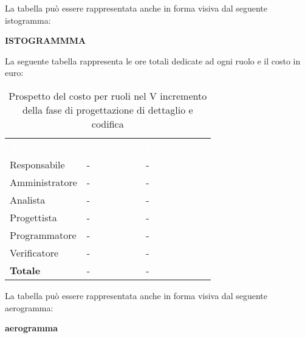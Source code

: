 La tabella può essere rappresentata anche in forma visiva dal seguente istogramma:

\textbf{ISTOGRAMMMA}


La seguente tabella rappresenta le ore totali dedicate ad ogni ruolo e il costo in euro:

\begin{table}[!htbp]
\begin{center}
\renewcommand{\arraystretch}{1.5}
\begin{tabular}{ m{}<{\centering}  m{}<{\centering} m{}<{\centering}}
	\rowcolor{darkblue}
	\textcolor{white}{\textbf{Ruolo}}&\textcolor{white}{\textbf{Totale ore}}&\textcolor{white}{\textbf{Costo totale}}\\ 

	Responsabile  & - & - \\	

	Amministratore & - & - \\
	
	Analista & - & - \\
	
	Progettista & - & - \\
	
	Programmatore & - & - \\
	
	Verificatore & - & - \\
	
	\textbf{Totale} & - & - \\
	
\end{tabular}
\caption{Prospetto del costo per ruoli nel V incremento della fase di progettazione di dettaglio e codifica}
\end{center}
\end{table}

La tabella può essere rappresentata anche in forma visiva dal seguente aerogramma:

\textbf{aerogramma}


